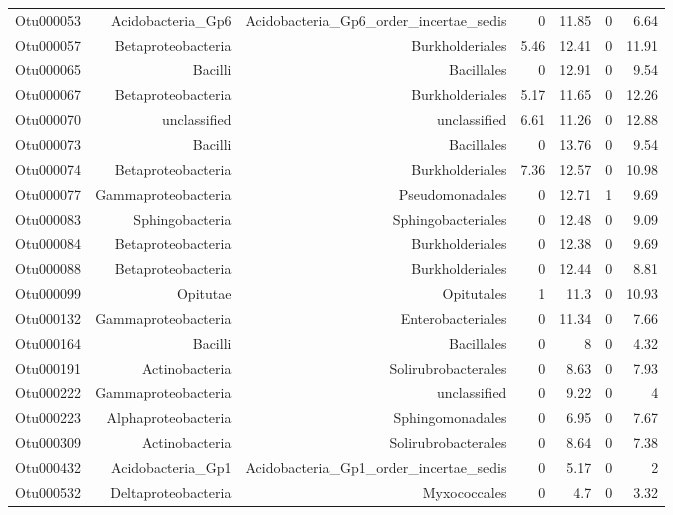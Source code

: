 \begin{table}[ht]
\begin{tabular}{crrrrrr}
  Otu000053 & Acidobacteria\_Gp6 & Acidobacteria\_Gp6\_order\_incertae\_sedis & 0 & 11.85 & 0 & 6.64 \\ 
  Otu000057 & Betaproteobacteria & Burkholderiales & 5.46 & 12.41 & 0 & 11.91 \\ 
  Otu000065 & Bacilli & Bacillales & 0 & 12.91 & 0 & 9.54 \\ 
  Otu000067 & Betaproteobacteria & Burkholderiales & 5.17 & 11.65 & 0 & 12.26 \\ 
  Otu000070 & unclassified & unclassified & 6.61 & 11.26 & 0 & 12.88 \\ 
  Otu000073 & Bacilli & Bacillales & 0 & 13.76 & 0 & 9.54 \\ 
  Otu000074 & Betaproteobacteria & Burkholderiales & 7.36 & 12.57 & 0 & 10.98 \\ 
  Otu000077 & Gammaproteobacteria & Pseudomonadales & 0 & 12.71 & 1 & 9.69 \\ 
  Otu000083 & Sphingobacteria & Sphingobacteriales & 0 & 12.48 & 0 & 9.09 \\ 
  Otu000084 & Betaproteobacteria & Burkholderiales & 0 & 12.38 & 0 & 9.69 \\ 
  Otu000088 & Betaproteobacteria & Burkholderiales & 0 & 12.44 & 0 & 8.81 \\ 
  Otu000099 & Opitutae & Opitutales & 1 & 11.3 & 0 & 10.93 \\ 
  Otu000132 & Gammaproteobacteria & Enterobacteriales & 0 & 11.34 & 0 & 7.66 \\ 
  Otu000164 & Bacilli & Bacillales & 0 & 8 & 0 & 4.32 \\ 
  Otu000191 & Actinobacteria & Solirubrobacterales & 0 & 8.63 & 0 & 7.93 \\ 
  Otu000222 & Gammaproteobacteria & unclassified & 0 & 9.22 & 0 & 4 \\ 
  Otu000223 & Alphaproteobacteria & Sphingomonadales & 0 & 6.95 & 0 & 7.67 \\ 
  Otu000309 & Actinobacteria & Solirubrobacterales & 0 & 8.64 & 0 & 7.38 \\ 
  Otu000432 & Acidobacteria\_Gp1 & Acidobacteria\_Gp1\_order\_incertae\_sedis & 0 & 5.17 & 0 & 2 \\ 
  Otu000532 & Deltaproteobacteria & Myxococcales & 0 & 4.7 & 0 & 3.32 \\ 
   \hline
\end{tabular}
\end{table}
